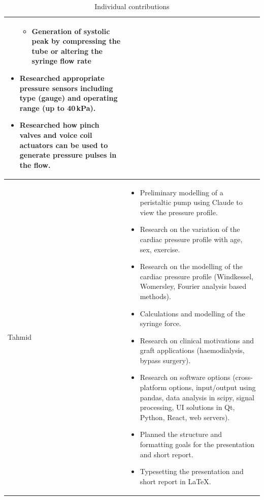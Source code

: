 \documentclass[10pt, a4paper]{article}
\begin{document}
\begin{table}[H]
\begin{tabularx}{\linewidth}{>{\raggedright\arraybackslash}p{1.5cm} X}
\begin{itemize}[nosep, leftmargin=*]
\begin{itemize}[nosep, leftmargin=*]
                      \item Generation of systolic peak by compressing the tube or altering the syringe flow rate
                  \end{itemize}
                            \item Researched appropriate pressure sensors including type (gauge) and operating range (up to 40\,kPa).
                            \item Researched how pinch valves and voice coil actuators can be used to generate pressure pulses in the flow.
                        \end{itemize}   \\
        \midrule

        Tahmid
                      & \begin{itemize}[nosep, leftmargin=*]
                            \item Preliminary modelling of a peristaltic pump using Claude to view the pressure profile.
                            \item Research on the variation of the cardiac pressure profile with age, sex, exercise.
                            \item Research on the modelling of the cardiac pressure profile (Windkessel, Womersley, Fourier analysis based methods).
                            \item Calculations and modelling of the syringe force.
                            \item Research on clinical motivations and graft applications (haemodialysis, bypass surgery).
                            \item Research on software options (cross-platform options, input/output using pandas, data analysis in scipy, signal processing, UI solutions in Qt, Python, React, web servers).
                            \item Planned the structure and formatting goals for the presentation and short report.
                            \item Typesetting the presentation and short report in \LaTeX{}.
                        \end{itemize} \\

        \midrule

        \bottomrule
    \end{tabularx}
    \caption{Individual contributions}
\end{table}
\end{document}
